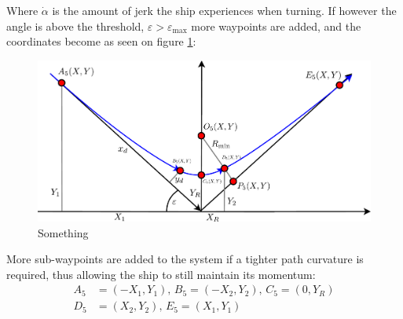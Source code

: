 \documentclass[a0,portrait]{a0poster}
\begin{document}
\begin{center}
{Where $\dot{\alpha}$ is the amount of jerk the ship experiences when turning. If however the angle is above the threshold, $\varepsilon > \varepsilon_\text{max}$ more waypoints are added, and the coordinates become as seen on figure \ref{fig:5points}:
\begin{figure}
	\centering %
	\includegraphics[width=\threecolwidth]{img/5points}
  	\caption{Something}
	\label{fig:5points}
\end{figure}
More sub-waypoints are added to the system if a tighter path curvature is required, thus allowing the ship to still maintain its momentum:
\begin{align}
A_5 &= (-X_1,Y_1),\, B_5 = (-X_2,Y_2),\, C_5 = (0,Y_R)\\
D_5 &= (X_2,Y_2),\, E_5 = (X_1,Y_1)
\end{align}


}
\col{
}
\end{center}
\end{document}
